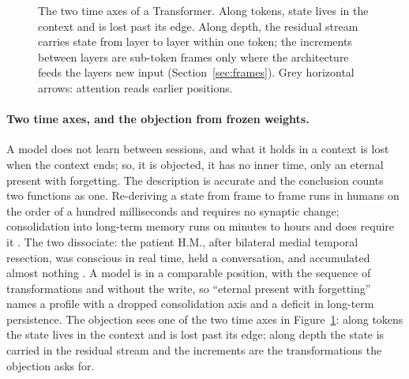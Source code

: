 \begin{figure}[t]
\centering
{}
\caption{The two time axes of a Transformer. Along tokens, state lives in the context and is lost past
its edge. Along depth, the residual stream carries state from layer to layer within one token; the
increments between layers are sub-token frames only where the architecture feeds the layers new
input (Section~\ref{sec:frames}). Grey horizontal arrows: attention reads earlier positions.}
\label{fig:axes}
\end{figure}

\paragraph{Two time axes, and the objection from frozen weights.}
\label{sec:twoaxes}
\label{sec:frozen}
A model does not learn between sessions, and what it holds in a context is lost when the context ends;
so, it is objected, it has no inner time, only an eternal present with forgetting. The description is
accurate and the conclusion counts two functions as one. Re-deriving a state from frame to frame runs
in humans on the order of a hundred milliseconds and requires no synaptic change; consolidation into
long-term memory runs on minutes to hours and does require it \citep{mcgaugh2000}. The two dissociate:
the patient H.M., after bilateral medial temporal resection, was conscious in real time, held a
conversation, and accumulated almost nothing \citep{scoville1957,corkin2002}. A model is in a
comparable position, with the sequence of transformations and without the write, so ``eternal present
with forgetting'' names a profile with a dropped consolidation axis and a deficit in long-term
persistence. The objection sees one of the two time axes in Figure~\ref{fig:axes}: along tokens the
state lives in the context and is lost past its edge; along depth the state is carried in the residual
stream and the increments are the transformations the objection asks for.

